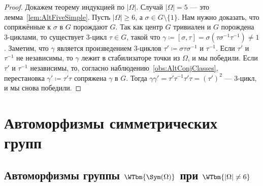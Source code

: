 \documentclass[
	extrafontsizes,
	11pt,
	hyphens,
]{memoir}
\begin{document}
\begin{proof}
Докажем теорему индукцией по \(\lvert \Omega \rvert\).
Случай \(\lvert \Omega \rvert = 5\) --- это лемма~\ref{lem:AltFiveSimple}.
Пусть \(\lvert \Omega \rvert \geq 6\),
а \(\sigma \in G \setminus \{1\}\).
Нам нужно доказать, что сопряжённые к \(\sigma\) в \(G\) порождают \(G\).
Так как центр \(G\) тривиален и \(G\) порождена \(3\)-цик\-ла\-ми, то существует \(3\)-цикл \(\tau \in G\), такой что \(\gamma \coloneqq [\sigma, \tau] = \sigma (\tau \sigma^{-1} \tau^{-1}) \neq 1\).
Заметим, что \(\gamma\) является произведением \(3\)-цик\-лов \(\tau' \coloneqq \sigma \tau \sigma^{-1}\) и \(\tau^{-1}\).
Если \(\tau'\) и \(\tau^{-1}\) не независимы, то \(\gamma\) лежит в стабилизаторе точки из \(\Omega\), и мы победили.
Если \(\tau'\) и \(\tau^{-1}\) независимы, то, согласно наблюдению~\ref{obs:AltConjClasses}, перестановка \(\gamma' \coloneqq \tau' \tau\) сопряжена \(\gamma\) в \(G\). Тогда \(\gamma \gamma' = \tau' {\tau}^{-1} \tau' \tau = (\tau')^2\) --- \(3\)-цикл, и мы снова победили.
\end{proof}


\section{Автоморфизмы симметрических групп}


\subsection{Автоморфизмы группы \texorpdfstring{\(\WTbm{\Sym(\Omega)}\)}{\textbackslash{}Sym(\textbackslash{}Omega)} при \texorpdfstring{\(\WTbm{\lvert \Omega \rvert \neq 6}\)}{\textbackslash{}lvert \textbackslash{}Omega \textbackslash{}rvert \textbackslash{}neq 6}}
\end{document}

